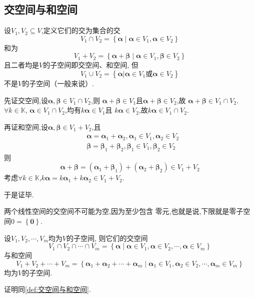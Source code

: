 \subsection{交空间与和空间}
\begin{formal}
\begin{definition}[交空间与和空间]\label{def:交空间与和空间}
    设$V_1,V_2
    \subseteq V$,定义它们的交为集合的交
    \[
    V_1 \cap V_2
     = \left\{
        \bm{\alpha} \mid 
        \bm{\alpha} \in V_1,
        \bm{\alpha} \in V_2
     \right\}
    \]
    和为
    \[
    V_1 + V_2 =\left\{
        \bm{\alpha} + \bm{\beta} \mid 
        \bm{\alpha} \in V_1,
        \bm{\beta} \in V_2
    \right\}
    \]
    且二者均是$V$的子空间即交空间、和空间,
    但
    \[
    V_1\cup V_2 =\left\{
        \bm{\alpha} | 
        \bm{\alpha} \in V_1 \text{或}
        \bm{\alpha} \in V_2
    \right\}
    \]
    不是$V$的子空间（一般来说）.
\end{definition}
\begin{Proof}
先证交空间,设$\bm{\alpha},\bm{\beta}\in V_1\cap V_2$,则
$\bm{\alpha}+\bm{\beta}\in V_1$且$\bm{\alpha}+\bm{\beta}\in V_2$,故
$\bm{\alpha}+\bm{\beta}\in V_1\cap V_2$.$\forall k \in\mathbb{K}$,
$\bm{\alpha}\in V_1\cap V_2$,均有$k\bm{\alpha}\in V_1$且
$k\bm{\alpha}\in V_2$,故$k\bm{\alpha}\in V_1\cap V_2.$

再证和空间,设$\bm{\alpha},\bm{\beta}\in V_1+V_2$,且
\begin{align*}
    &\bm{\alpha}=\bm{\alpha}_1+\bm{\alpha}_2,\bm{\alpha}_1\in V_1,\bm{\alpha}_2\in V_2\\
   & \bm{\beta}=\bm{\beta}_1+\bm{\beta}_2,\bm{\beta}_1\in V_1,\bm{\beta}_2\in V_2
\end{align*}
则
\[
\bm{\alpha}+\bm{\beta}=\left(\bm{\alpha}_1+\bm{\beta}_1\right)+
\left(\bm{\alpha}_2+\bm{\beta}_2\right)\in V_1+V_2
\]
考虑$\forall k \in \mathbb{K}$,$k\bm{\alpha}=k\bm{\alpha}_1
+k\bm{\alpha}_2\in V_1+V_2$.

于是证毕.
\end{Proof}
\end{formal}
\begin{red}
\begin{remark}
    两个线性空间的交空间不可能为空,因为至少包含
    零元,也就是说,下限就是零子空间$0=\left\{\bm{0}
    \right\}$.
\end{remark}
\end{red}
\begin{green}
\begin{corollary}[交空间与和空间推广]\label{cor:交空间与和空间推广}
    设$V_1,V_2,\cdots,V_m$均为$V$的子空间,
    则它们的交空间
    \[
    V_1 \cap V_2\cap\cdots \cap V_m
    = \left\{
        \bm{\alpha} \mid 
        \bm{\alpha} \in V_1 ,
        \bm{\alpha}\in V_2,
        \cdots,
        \bm{\alpha} \in V_m
    \right\}
    \]
    与和空间
    \[
    V_1 + V_2+\cdots + V_m =
    \left\{
        \bm{\alpha}_1 + \bm{\alpha}_2+\cdots +
        \bm{\alpha}_m\mid
        \bm{\alpha}_1 \in V_1,
        \bm{\alpha}_2\in V_2,
        \cdots,
        \bm{\alpha}_m \in V_m
    \right\}
    \]
    均为$V$的子空间.
\end{corollary}
\begin{Proof}
证明同\cref{def:交空间与和空间}.
\end{Proof}
\end{green}
